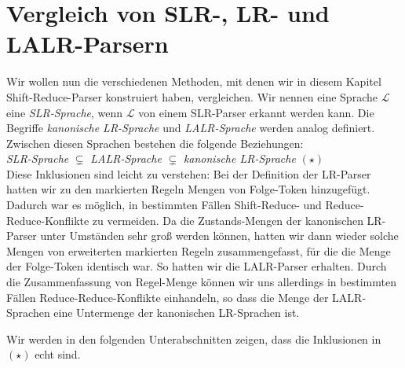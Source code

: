 \section{Vergleich von SLR-, LR- und LALR-Parsern}
Wir wollen nun die verschiedenen Methoden, mit denen wir in diesem Kapitel
Shift-Reduce-Parser konstruiert haben, vergleichen.  Wir nennen eine Sprache $\mathcal{L}$
eine \emph{SLR-Sprache}, wenn $\mathcal{L}$ von einem SLR-Parser erkannt werden kann.
Die Begriffe \emph{kanonische LR-Sprache} und \emph{LALR-Sprache} werden analog definiert.
 Zwischen diesen Sprachen bestehen die folgende Beziehungen:
\\[0.2cm]
\hspace*{1.3cm}
\emph{SLR-Sprache} $\subsetneq$ \emph{LALR-Sprache} $\subsetneq$ \emph{kanonische LR-Sprache} 
\hspace*{\fill} $(\star)$
\\[0.2cm]
Diese Inklusionen sind leicht zu verstehen:  Bei der Definition der LR-Parser hatten wir
zu den markierten Regeln  Mengen von Folge-Token hinzugef\"ugt.  Dadurch war
es m\"oglich, in bestimmten F\"allen Shift-Reduce- und Reduce-Reduce-Konflikte zu vermeiden.
Da die Zustands-Mengen der kanonischen LR-Parser unter Umst\"anden sehr gro{\ss} werden k\"onnen,
hatten wir dann wieder solche Mengen von erweiterten markierten Regeln zusammengefasst,
f\"ur die die Menge der Folge-Token identisch war.  So hatten wir die LALR-Parser
erhalten.  Durch die Zusammenfassung von Regel-Menge k\"onnen wir
uns allerdings in bestimmten F\"allen Reduce-Reduce-Konflikte einhandeln, so dass die 
Menge der LALR-Sprachen eine Untermenge der kanonischen LR-Sprachen ist.

Wir werden in den folgenden Unterabschnitten zeigen, dass die Inklusionen in $(\star)$ echt sind.  

